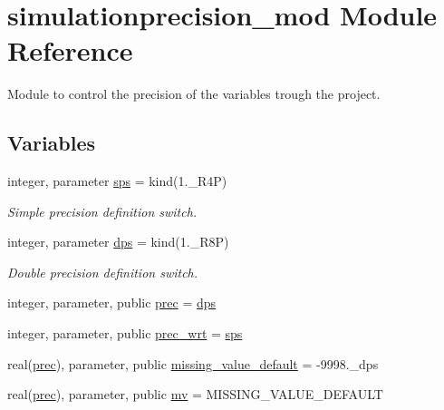 \hypertarget{namespacesimulationprecision__mod}{}\section{simulationprecision\+\_\+mod Module Reference}
\label{namespacesimulationprecision__mod}


Module to control the precision of the variables trough the project.  


\subsection*{Variables}
\begin{DoxyCompactItemize}
\item 
integer, parameter \mbox{\hyperlink{namespacesimulationprecision__mod_a4e5f74805628e67a1d7b33106780b85d}{sps}} = kind(1.\+\_\+\+R4P)
\begin{DoxyCompactList}\small\item\em Simple precision definition switch. \end{DoxyCompactList}\item 
integer, parameter \mbox{\hyperlink{namespacesimulationprecision__mod_a1993497bc3b1b9925d3e409fe8891e8c}{dps}} = kind(1.\+\_\+\+R8P)
\begin{DoxyCompactList}\small\item\em Double precision definition switch. \end{DoxyCompactList}\item 
integer, parameter, public \mbox{\hyperlink{namespacesimulationprecision__mod_a361ca48174e0dc2228c07f25fa5396ec}{prec}} = \mbox{\hyperlink{namespacesimulationprecision__mod_a1993497bc3b1b9925d3e409fe8891e8c}{dps}}
\item 
integer, parameter, public \mbox{\hyperlink{namespacesimulationprecision__mod_a2afc058035b6678d4ba773117f7c5202}{prec\+\_\+wrt}} = \mbox{\hyperlink{namespacesimulationprecision__mod_a4e5f74805628e67a1d7b33106780b85d}{sps}}
\item 
real(\mbox{\hyperlink{namespacesimulationprecision__mod_a361ca48174e0dc2228c07f25fa5396ec}{prec}}), parameter, public \mbox{\hyperlink{namespacesimulationprecision__mod_a8fe62365170cdfed5a745be6d8e99e1c}{missing\+\_\+value\+\_\+default}} = -\/9998.\+\_\+dps
\item 
real(\mbox{\hyperlink{namespacesimulationprecision__mod_a361ca48174e0dc2228c07f25fa5396ec}{prec}}), parameter, public \mbox{\hyperlink{namespacesimulationprecision__mod_aee970e36f3dc8fb77c175ead993257d9}{mv}} = M\+I\+S\+S\+I\+N\+G\+\_\+\+V\+A\+L\+U\+E\+\_\+\+D\+E\+F\+A\+U\+LT

\end{DoxyCompactItemize}
